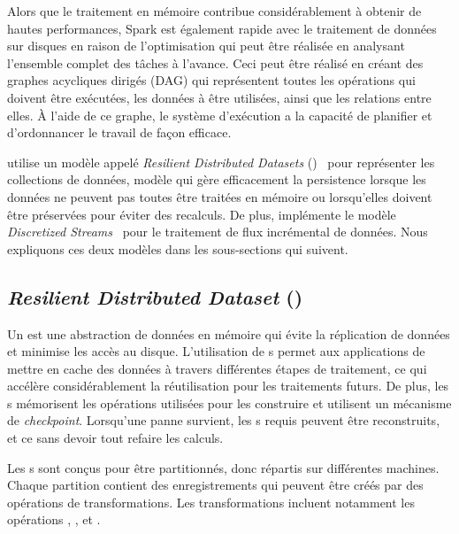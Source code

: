 Alors que le traitement en m\'emoire contribue consid\'erablement \`a obtenir de hautes performances, Spark est \'egalement rapide avec le traitement de donn\'ees sur disques en raison de l'optimisation qui peut \^etre r\'ealis\'ee en analysant l'ensemble complet des t\^aches \`a l'avance. Ceci peut \^etre r\'ealis\'e en cr\'eant des graphes acycliques dirig\'es (DAG) qui repr\'esentent toutes les op\'erations qui doivent \^etre ex\'ecut\'ees, les donn\'ees \`a \^etre utilis\'ees, ainsi que les relations entre elles. \`A l'aide de ce graphe, le syst\`eme d'ex\'ecution a la capacit\'e de planifier et d'ordonnancer le travail de fa\c{c}on efficace.

 utilise un mod\`ele appel\'e \emph{Resilient Distributed Datasets} ()~\citep{Salloum2016} pour repr\'esenter les collections de donn\'ees, mod\`ele qui g\`ere efficacement la persistence lorsque les donn\'ees ne peuvent pas toutes \^etre trait\'ees en m\'emoire ou lorsqu'elles doivent \^etre pr\'eserv\'ees pour \'eviter des recalculs. De plus,  impl\'emente le mod\`ele \emph{Discretized Streams}~\citep{zaharia2013discretized} pour le traitement de flux incr\'emental de donn\'ees.
%
Nous expliquons ces deux mod\`eles dans les sous-sections qui suivent.


\subsection{\emph{Resilient Distributed Dataset} ()}

Un  est une abstraction de donn\'ees en m\'emoire qui \'evite la r\'eplication de donn\'ees et minimise les acc\`es au disque. L'utilisation de s permet aux applications de mettre en cache des donn\'ees \`a travers diff\'erentes \'etapes de traitement, ce qui acc\'el\`ere consid\'erablement la r\'eutilisation pour les traitements futurs. De plus, les s m\'emorisent les op\'erations utilis\'ees pour les construire et utilisent un m\'ecanisme de \emph{checkpoint}. Lorsqu'une panne survient, les s requis peuvent \^etre reconstruits, et ce sans devoir tout refaire les calculs.

Les s sont conçus pour \^etre partitionn\'es, donc r\'epartis sur diff\'erentes machines. Chaque partition contient des enregistrements qui peuvent \^etre cr\'e\'es par des op\'erations de transformations. Les transformations incluent notamment les opérations , ,  et .




